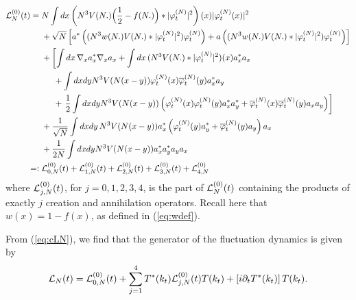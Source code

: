 \documentclass[11pt,a4paper]{article}
\newcommand{\done}{}
\newcommand{\cL}{{\cal L}}
\newcommand{\di}{{d}}		%
\newcommand{\ph}{\varphi_t^{(N)}}	%
\begin{document}
\[ \begin{split} \cL_N^{(0)} (t) = \; & %
N \int \di x\left( N^3 V(N.)\Big(\frac{1}{2}-f(N.)\Big)\ast \lvert \ph\rvert^2 \right)(x) \lvert \ph(x)\rvert^2 \done\\
&+ \sqrt{N}  \left[  a^*\left( (N^3
w(N.) V (N.) *| \varphi_t^{(N)}|^2) \varphi_t^{(N)} \right)
+ a\left( (N^3 w (N.)V (N.) *| \varphi_t^{(N)}|^2) \varphi_t^{(N)} \right) \right] \\
&+ \left[ \int dx \, \nabla_x a_x^* \nabla_x a_x + \int dx \, (N^3 V (N.) * |\varphi_t^{(N)}|^2) (x) a_x^* a_x \right. \\ 
&\hspace{.5cm}+ \int dx dy N^3 V(N (x-y)) \varphi_t^{(N)} (x) \overline{\varphi}_t^{(N)} (y) a_x^* a_y \\
&\hspace{.5cm}+ \left.  \frac{1}{2} \int dx dy N^3 V(N (x-y)) \left( \varphi_t^{(N)} (x) \varphi_t^{(N)} (y) a_x^* a_y^* + 
\overline{\varphi}_t^{(N)} (x) \overline{\varphi}_t^{(N)} (y) a_x a_y \right) \right] \\
&+ \frac{1}{\sqrt{N}}  \int dx dy \, N^3 V(N(x-y)) a_x^* \left( \varphi_t^{(N)} (y) a_y^* + \overline{\varphi}_t^{(N)} (y) a_y \right) a_x \\
&+\frac{1}{2N} \int dx dy N^3 V(N (x-y)) a_x^* a_y^* a_y a_x \\
=: \; & \cL_{0,N}^{(0)} (t) + \cL_{1,N}^{(0)} (t) + \cL_{2,N}^{(0)} (t) +  
\cL_{3,N}^{(0)} (t) + \cL_{4,N}^{(0)} 
\end{split} \]
where $\cL^{(0)}_{j,N} (t)$, for $j=0,1,2,3,4$, is the part of $\cL_N^{(0)} (t)$ containing the products of exactly $j$ creation and annihilation operators. Recall here that $w (x) = 1 - f (x)$, as defined in (\ref{eq:wdef}). 

{F}rom (\ref{eq:cLN}), we find that the generator of the fluctuation dynamics is given by
\begin{equation}\label{eq:dec-cLN} \cL_N (t) =  \cL_{0,N}^{(0)} (t) +
\sum_{j=1}^4 T^* (k_t) \cL_{j,N}^{(0)} (t) T (k_t) +\left[ i \partial_t T^*
(k_t) \right] T(k_t). \end{equation}
\end{document}
